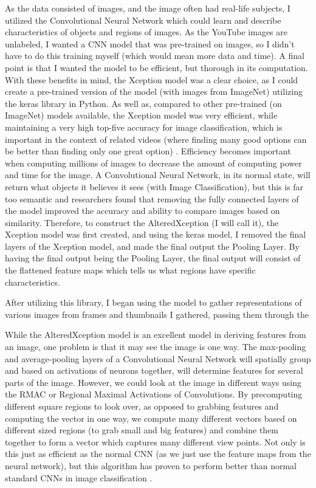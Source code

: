 \documentclass[10pt,twocolumn]{article}
\begin{document}
As the data consisted of images, and the image often had real-life subjects, I utilized the Convolutional Neural Network which could learn and describe characteristics of objects and regions of images. As the YouTube images are unlabeled, I wanted a CNN model that was pre-trained on images, so I didn't have to do this training myself (which would mean more data and time). A final point is that I wanted the model to be efficient, but thorough in its computation. With these benefits in mind, the Xception model was a clear choice, as I could create a pre-trained version of the model (with images from ImageNet) utilizing the keras library in Python. As well as, compared to other pre-trained (on ImageNet) models available, the Xception model was very efficient, while maintaining a very high top-five accuracy for image classification, which is important in the context of related videos (where finding many good options can be better than finding only one great option) \cite{Stancic2022}. Efficiency becomes important when computing millions of images to decrease the amount of computing power and time for the image. A Convolutional Neural Network, in its normal state, will return what objects it believes it sees (with Image Classification), but this is far too semantic and researchers found that removing the fully connected layers of the model improved the accuracy and ability to compare images based on similarity. Therefore, to construct the AlteredXception (I will call it), the Xception model was first created, and using the keras model, I removed the final layers of the Xception model, and made the final output the Pooling Layer. By having the final output being the Pooling Layer, the final output will consist of the flattened feature maps which tells us what regions have specific characteristics.

After utilizing this library, I began using the model to gather representations of various images from frames and thumbnails I gathered, passing them through the 


 
While the AlteredXception model is an excellent model in deriving features from an image, one problem is that it may see the image is one way. The max-pooling and average-pooling layers of a Convolutional Neural Network will spatially group and based on activations of neurons together, will determine features for several parts of the image. However, we could look at the image in different ways using the RMAC or Regional Maximal Activations of Convolutions. By precomputing different square regions to look over, as opposed to grabbing features and computing the vector in one way, we compute many different vectors based on different sized regions (to grab small and big features) and combine them together to form a vector which captures many different view points. Not only is this just as efficient as the normal CNN (as we just use the feature maps from the neural network), but this algorithm has proven to perform better than normal standard CNNs in image classification \cite{}.
\end{document}
